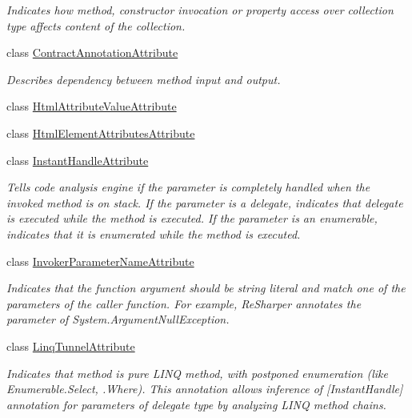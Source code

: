\begin{DoxyCompactItemize}
\begin{DoxyCompactList}\small\item\em Indicates how method, constructor invocation or property access over collection type affects content of the collection. \end{DoxyCompactList}\item 
class \mbox{\hyperlink{class_r_f_storage_1_1_contract_annotation_attribute}{Contract\+Annotation\+Attribute}}
\begin{DoxyCompactList}\small\item\em Describes dependency between method input and output. \end{DoxyCompactList}\item 
class \mbox{\hyperlink{class_r_f_storage_1_1_html_attribute_value_attribute}{Html\+Attribute\+Value\+Attribute}}
\item 
class \mbox{\hyperlink{class_r_f_storage_1_1_html_element_attributes_attribute}{Html\+Element\+Attributes\+Attribute}}
\item 
class \mbox{\hyperlink{class_r_f_storage_1_1_instant_handle_attribute}{Instant\+Handle\+Attribute}}
\begin{DoxyCompactList}\small\item\em Tells code analysis engine if the parameter is completely handled when the invoked method is on stack. If the parameter is a delegate, indicates that delegate is executed while the method is executed. If the parameter is an enumerable, indicates that it is enumerated while the method is executed. \end{DoxyCompactList}\item 
class \mbox{\hyperlink{class_r_f_storage_1_1_invoker_parameter_name_attribute}{Invoker\+Parameter\+Name\+Attribute}}
\begin{DoxyCompactList}\small\item\em Indicates that the function argument should be string literal and match one of the parameters of the caller function. For example, Re\+Sharper annotates the parameter of System.\+Argument\+Null\+Exception. \end{DoxyCompactList}\item 
class \mbox{\hyperlink{class_r_f_storage_1_1_linq_tunnel_attribute}{Linq\+Tunnel\+Attribute}}
\begin{DoxyCompactList}\small\item\em Indicates that method is pure L\+I\+NQ method, with postponed enumeration (like Enumerable.\+Select, .Where). This annotation allows inference of \mbox{[}Instant\+Handle\mbox{]} annotation for parameters of delegate type by analyzing L\+I\+NQ method chains. \end{DoxyCompactList}\item 

\end{DoxyCompactItemize}
